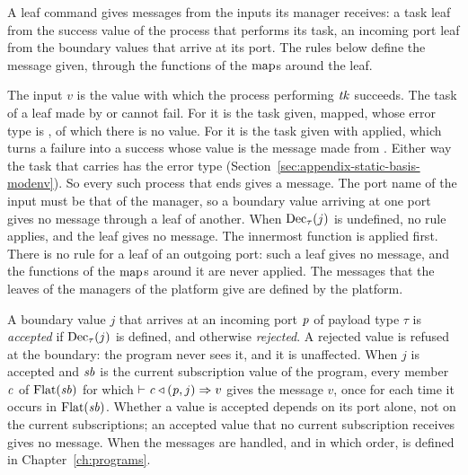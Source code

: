 A leaf command gives messages from the inputs its manager receives: a task
leaf from the success value of the process that performs its task, an
incoming port leaf from the boundary values that arrive at its port. The rules
below define the message given, through the functions of the $\mathrm{map}$s
around the leaf.


  {}

  {}

  {}

\begin{rulecomments}
 The input $v$ is the value with which the process
performing $\mathit{tk}$ succeeds. The task of a leaf made by  or
 cannot fail. For  it is the task given,
mapped, whose error type is , of which there is no value. For
 it is the task given with  applied, which
turns a failure into a success whose value is the message made from .
Either way the task that  carries has the error type 
(Section~\ref{sec:appendix-static-basis-modenv}). So every such process that
ends gives a message.
 The port name of the input must be that of the
manager, so a boundary value arriving at one port gives no message through a
leaf of another. When $\mathrm{Dec}_{\tau}(j)$ is undefined, no rule applies, and the
leaf gives no message.
 The innermost function is applied first. There is no
rule for a leaf of an outgoing port: such a leaf gives no message, and the
functions of the $\mathrm{map}$s around it are never applied. The messages that
the leaves of the managers of the platform give are defined by the platform.
\end{rulecomments}

A boundary value $j$ that arrives at an incoming port $\mathit{p}$ of payload type
$\tau$ is \emph{accepted} if $\mathrm{Dec}_{\tau}(j)$ is defined, and otherwise
\emph{rejected}. A rejected value is refused at the boundary: the program
never sees it, and it is unaffected. %
When $j$ is accepted and $\mathit{sb}$ is the current subscription value of the
program, every member $\mathit{c}$ of $\mathrm{Flat}(\mathit{sb})$ for which
$\vdash \mathit{c} \triangleleft (\mathit{p},j) \Rightarrow v$ gives the message $v$, once for each time it
occurs in $\mathrm{Flat}(\mathit{sb})$. Whether a value is accepted depends on its port
alone, not on the current subscriptions; an accepted value that no current
subscription receives gives no message. When the messages are handled, and
in which order, is defined in Chapter~\ref{ch:programs}.
